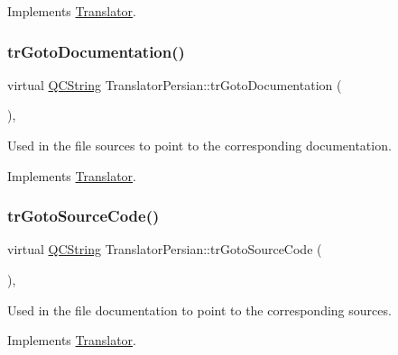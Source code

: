 Implements \mbox{\hyperlink{class_translator}{Translator}}.

\mbox{\label{class_translator_persian_a568ffe99c6844c2e07fc8622a12346f5}} 
\subsubsection{\texorpdfstring{trGotoDocumentation()}{trGotoDocumentation()}}
{\footnotesize\ttfamily virtual \mbox{\hyperlink{class_q_c_string}{Q\+C\+String}} Translator\+Persian\+::tr\+Goto\+Documentation (\begin{DoxyParamCaption}{ }\end{DoxyParamCaption})\hspace{0.3cm}{\ttfamily [inline]}, {\ttfamily [virtual]}}

Used in the file sources to point to the corresponding documentation. 

Implements \mbox{\hyperlink{class_translator}{Translator}}.

\mbox{\label{class_translator_persian_a846d38ea7744f8cda16e9b9caeba77f9}} 
\subsubsection{\texorpdfstring{trGotoSourceCode()}{trGotoSourceCode()}}
{\footnotesize\ttfamily virtual \mbox{\hyperlink{class_q_c_string}{Q\+C\+String}} Translator\+Persian\+::tr\+Goto\+Source\+Code (\begin{DoxyParamCaption}{ }\end{DoxyParamCaption})\hspace{0.3cm}{\ttfamily [inline]}, {\ttfamily [virtual]}}

Used in the file documentation to point to the corresponding sources. 

Implements \mbox{\hyperlink{class_translator}{Translator}}.

\mbox{\label{class_translator_persian_a3d2da9079a432bb8dc7712df9ec62350}} 
